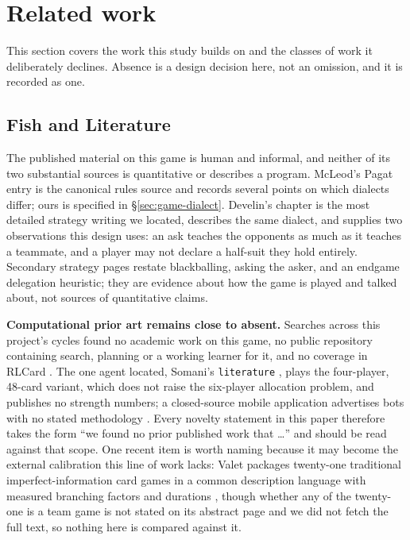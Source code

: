 \section{Related work}
\label{sec:related}

This section covers the work this study builds on and the classes of work it deliberately declines.
Absence is a design decision here, not an omission, and it is recorded as one.

\subsection{Fish and Literature}
\label{sec:related-fish}

The published material on this game is human and informal, and neither of its two substantial
sources is quantitative or describes a program. McLeod's Pagat entry \cite{pagat} is the canonical
rules source and records several points on which dialects differ; ours is specified in
\S\ref{sec:game-dialect}. Develin's chapter \cite{develin} is the most detailed strategy writing we
located, describes the same dialect, and supplies two observations this design uses: an ask teaches
the opponents as much as it teaches a teammate, and a player may not declare a half-suit they hold
entirely. Secondary strategy pages \cite{dorsa,strategy-site,wikiliterature} restate blackballing,
asking the asker, and an endgame delegation heuristic; they are evidence about how the game is
played and talked about, not sources of quantitative claims.

\textbf{Computational prior art remains close to absent.} Searches across this project's cycles
found no academic work on this game, no public repository containing search, planning or a working
learner for it, and no coverage in RLCard \cite{rlcard}. The one agent located, Somani's
\texttt{literature} \cite{somani,somani-server}, plays the four-player, 48-card variant, which does
not raise the six-player allocation problem, and publishes no strength numbers; a closed-source
mobile application advertises bots with no stated methodology \cite{playstore}. Every novelty
statement in this paper therefore takes the form ``we found no prior published work that \ldots{}''
and should be read against that scope. One recent item is worth naming because it may become the
external calibration this line of work lacks: Valet packages twenty-one traditional
imperfect-information card games in a common description language with measured branching factors
and durations \cite{goadrich2026valet}, though whether any of the twenty-one is a team game is not
stated on its abstract page and we did not fetch the full text, so nothing here is compared against
it.

